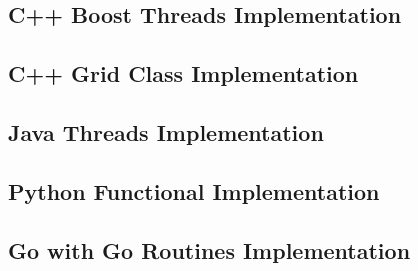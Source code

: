 \documentclass[11pt]{article} %
\begin{document}
\subsection{C++ Boost Threads Implementation}

\pagebreak
\subsection{C++ Grid Class Implementation}

\pagebreak
\subsection{Java Threads Implementation}

\pagebreak
\subsection{Python Functional Implementation}

\pagebreak
\subsection{Go with Go Routines Implementation}

\pagebreak
\end{document}
